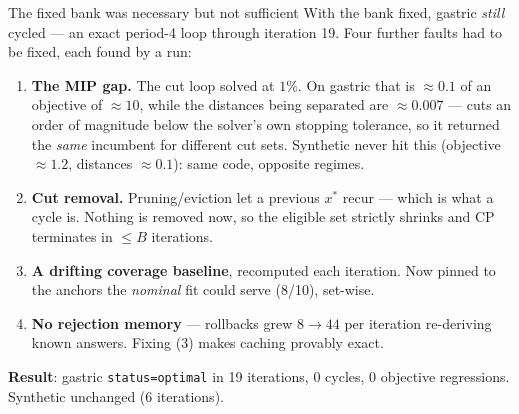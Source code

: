 \documentclass{beamer}
\begin{document}
\begin{frame}{The fixed bank was necessary but not sufficient}
  \small
  With the bank fixed, gastric \emph{still} cycled --- an exact period-4 loop
  through iteration 19. Four further faults had to be fixed, each found by a run:
  \begin{enumerate}
    \item \textbf{The MIP gap.} The cut loop solved at $1\%$. On gastric that is
      $\approx0.1$ of an objective of $\approx10$, while the distances being
      separated are $\approx0.007$ --- cuts an order of magnitude below the
      solver's own stopping tolerance, so it returned the \emph{same} incumbent
      for different cut sets. Synthetic never hit this (objective $\approx1.2$,
      distances $\approx0.1$): same code, opposite regimes.
    \item \textbf{Cut removal.} Pruning/eviction let a previous $x^\ast$ recur ---
      which is what a cycle is. Nothing is removed now, so the eligible set
      strictly shrinks and CP terminates in $\le B$ iterations.
    \item \textbf{A drifting coverage baseline}, recomputed each iteration. Now
      pinned to the anchors the \emph{nominal} fit could serve (8/10), set-wise.
    \item \textbf{No rejection memory} --- rollbacks grew $8\to44$ per iteration
      re-deriving known answers. Fixing (3) makes caching provably exact.
  \end{enumerate}
  \medskip
  \textbf{Result}: gastric \texttt{status=optimal} in 19 iterations, 0 cycles,
  0 objective regressions. Synthetic unchanged (6 iterations).
\end{frame}
\end{document}
